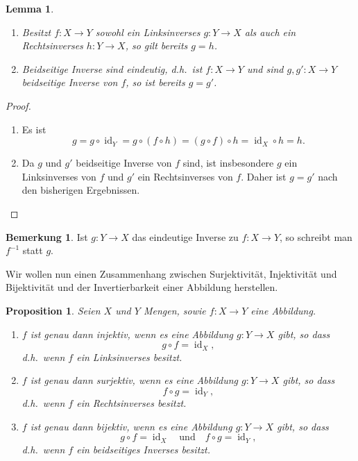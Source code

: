 \documentclass[a4paper,10pt]{article}
\newcounter{propositions}
\newtheorem{prop}[propositions]{Proposition}
\newtheorem{lem}[propositions]{Lemma}
\theoremstyle{definition}
\newtheorem*{bem}{Bemerkung}
\DeclareMathOperator{\id}{id}
\begin{document}
\begin{lem}
 \begin{enumerate}[label=\arabic*), leftmargin=*]
  \item
   Besitzt $f \colon X \to Y$ sowohl ein Linksinverses $g \colon Y \to X$ als auch ein Rechtsinverses $h \colon Y \to X$, so gilt bereits $g = h$.
  \item
   Beidseitige Inverse sind eindeutig, d.h.\ ist $f \colon X \to Y$ und sind $g, g' \colon X \to Y$ beidseitige Inverse von $f$, so ist bereits $g = g'$.
 \end{enumerate}
\end{lem}
\begin{proof}
 \begin{enumerate}[label=\arabic*), leftmargin=*]
  \item
   Es ist
   \[
    g
    = g \circ \id_Y
    = g \circ (f \circ h)
    = (g \circ f) \circ h
    = \id_X \circ h
    = h.
   \]
  \item
   Da $g$ und $g'$ beidseitige Inverse von $f$ sind, ist insbesondere $g$ ein Linksinverses von $f$ und $g'$ ein Rechtsinverses von $f$. Daher ist $g = g'$ nach den bisherigen Ergebnissen.
 \end{enumerate}
\end{proof}

\begin{bem}
 Ist $g \colon Y \to X$ das eindeutige Inverse zu $f \colon X \to Y$, so schreibt man $f^{-1}$ statt $g$.
\end{bem}

Wir wollen nun einen Zusammenhang zwischen Surjektivität, Injektivität und Bijektivität und der Invertierbarkeit einer Abbildung herstellen.

\begin{prop}
 Seien $X$ und $Y$ Mengen, sowie $f \colon X \to Y$ eine Abbildung.
 \begin{enumerate}[label=\arabic*),leftmargin=*]
  \item
   $f$ ist genau dann injektiv, wenn es eine Abbildung $g \colon Y \to X$ gibt, so dass
   \[
    g \circ f = \id_X,
   \]
   d.h.\ wenn $f$ ein Linksinverses besitzt.
  \item
   $f$ ist genau dann surjektiv, wenn es eine Abbildung $g \colon Y \to X$ gibt, so dass
   \[
    f \circ g = \id_Y,
   \]
   d.h.\ wenn $f$ ein Rechtsinverses besitzt.
  \item
   $f$ ist genau dann bijektiv, wenn es eine Abbildung $g \colon Y \to X$ gibt, so dass
   \[
    g \circ f = \id_X \quad \text{und} \quad f \circ g = \id_Y,
   \]
   d.h.\ wenn $f$ ein beidseitiges Inverses besitzt.
 \end{enumerate}
\end{prop}
\end{document}
